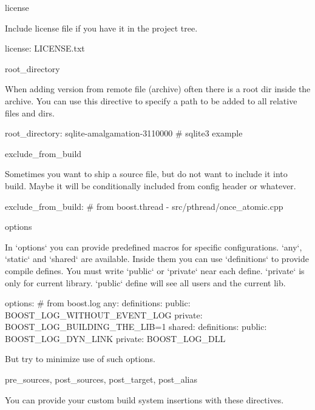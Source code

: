 license

Include license file if you have it in the project tree.

    license: LICENSE.txt

root_directory

When adding version from remote file (archive) often there is a root dir inside the archive. You can use this directive to specify a path to be added to all relative files and dirs.

\begin{cppan}
    root_directory: sqlite-amalgamation-3110000 # sqlite3 example
\end{cppan}

exclude_from_build

Sometimes you want to ship a source file, but do not want to include it into build. Maybe it will be conditionally included from config header or whatever.

\begin{cppan}
    exclude_from_build: # from boost.thread
      - src/pthread/once_atomic.cpp
\end{cppan}

options

In `options` you can provide predefined macros for specific configurations.
`any`, `static` and `shared` are available.
Inside them you can use `definitions` to provide compile defines. You must write `public` or `private` near each define. `private` is only for current library. `public` define will see all users and the current lib.

\begin{cppan}
    options: # from boost.log
        any:
          definitions:
            public: BOOST_LOG_WITHOUT_EVENT_LOG
            private: BOOST_LOG_BUILDING_THE_LIB=1
        shared:
          definitions:
            public: BOOST_LOG_DYN_LINK
            private: BOOST_LOG_DLL
\end{cppan}

But try to minimize use of such options.

pre_sources, post_sources, post_target, post_alias

You can provide your custom build system insertions with these directives.


